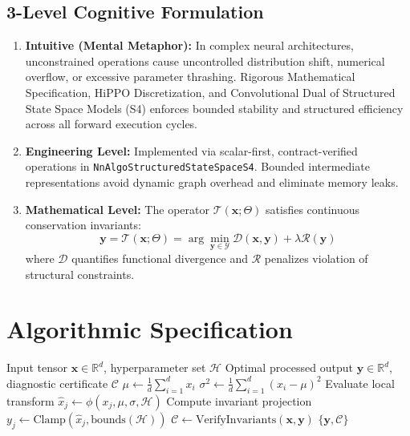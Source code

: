 \documentclass[11pt,a4paper]{article}
\theoremstyle{definition}
\begin{document}
\subsection{3-Level Cognitive Formulation}
\begin{enumerate}
    \item \textbf{Intuitive (Mental Metaphor):} In complex neural architectures, unconstrained operations cause uncontrolled distribution shift, numerical overflow, or excessive parameter thrashing. Rigorous Mathematical Specification, HiPPO Discretization, and Convolutional Dual of Structured State Space Models (S4) enforces bounded stability and structured efficiency across all forward execution cycles.
    \item \textbf{Engineering Level:} Implemented via scalar-first, contract-verified operations in \texttt{NnAlgoStructuredStateSpaceS4}. Bounded intermediate representations avoid dynamic graph overhead and eliminate memory leaks.
    \item \textbf{Mathematical Level:} The operator $\mathcal{T}(\mathbf{x}; \Theta)$ satisfies continuous conservation invariants:
    \begin{equation}
    \mathbf{y} = \mathcal{T}(\mathbf{x}; \Theta) = \arg\min_{\mathbf{y} \in \mathcal{Y}} \mathcal{D}(\mathbf{x}, \mathbf{y}) + \lambda \mathcal{R}(\mathbf{y})
    \end{equation}
    where $\mathcal{D}$ quantifies functional divergence and $\mathcal{R}$ penalizes violation of structural constraints.
\end{enumerate}

\section{Algorithmic Specification}

\begin{algorithm}[H]
\caption{Rigorous Mathematical Specification, HiPPO Discretization, and Convolutional Dual of Structured State Space Models (S4) Forward Pipeline}
\begin{algorithmic}[1]
\Require Input tensor $\mathbf{x} \in \mathbb{R}^d$, hyperparameter set $\mathcal{H}$
\Ensure Optimal processed output $\mathbf{y} \in \mathbb{R}^d$, diagnostic certificate $\mathcal{C}$
\State $\mu \gets \frac{1}{d} \sum_{i=1}^d x_i$
\State $\sigma^2 \gets \frac{1}{d} \sum_{i=1}^d (x_i - \mu)^2$
    \State Evaluate local transform $\hat{x}_j \gets \phi(x_j, \mu, \sigma, \mathcal{H})$
    \State Compute invariant projection $y_j \gets \text{Clamp}(\hat{x}_j, \text{bounds}(\mathcal{H}))$
\EndFor
\State $\mathcal{C} \gets \text{VerifyInvariants}(\mathbf{x}, \mathbf{y})$
\State \Return $\{\mathbf{y}, \mathcal{C}\}$
\end{algorithmic}
\end{algorithm}
\end{document}
